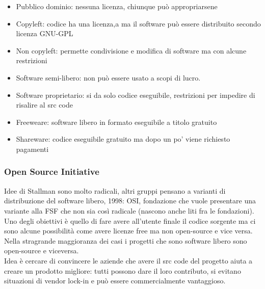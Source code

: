 \documentclass[12pt, oneside]{extbook}
\begin{document}
\begin{itemize}
\item Pubblico dominio: nessuna licenza, chiunque può appropriarsene
\item Copyleft: codice ha una licenza,a ma il software può essere distribuito secondo licenza GNU-GPL
\item Non copyleft: permette condivisione e modifica di software ma con alcune restrizioni
\item Software semi-libero: non può essere usato a scopi di lucro.
\item Software proprietario: si da solo codice eseguibile, restrizioni per impedire di risalire al src code
\item Freeweare: software libero in formato eseguibile a titolo gratuito
\item Shareware: codice eseguibile gratuito ma dopo un po' viene richiesto pagamenti
\end{itemize}
\subsubsection{Open Source Initiative}
Idee di Stallman sono molto radicali, altri gruppi pensano a varianti di distribuzione del software libero, 1998: OSI, fondazione che vuole presentare una variante alla FSF che non sia così radicale (nascono anche liti fra le fondazioni).\\ Uno degli obiettivi è quello di fare avere all'utente finale il codice sorgente ma ci sono alcune possibilità come avere licenze free ma non open-source e vice versa.\\ Nella stragrande maggioranza dei casi i progetti che sono software libero sono open-source e viceversa.\\ Idea è cercare di convincere le aziende che avere il src code del progetto aiuta a creare un prodotto migliore: tutti possono dare il loro contributo, si evitano situazioni di vendor lock-in e può essere commercialmente vantaggioso.
\end{document}
